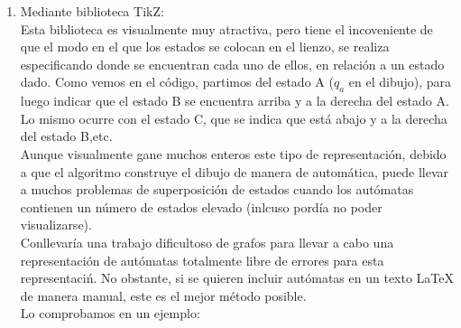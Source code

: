 \documentclass[12pt,a4paper,spanish]{book}
\begin{document}
\begin{itemize}
\begin{enumerate}
\newpage
\item Mediante biblioteca TikZ:\\
\newline
Esta biblioteca es visualmente muy atractiva, pero tiene el incoveniente de que el modo en el que los estados se colocan en el lienzo, se realiza especificando donde se encuentran cada uno de ellos, en relaci\'on a un estado dado.
Como vemos en el c\'odigo, partimos del estado A ($q_{a}$ en el dibujo), para luego indicar que el estado B se encuentra arriba y a la derecha del estado A. Lo mismo ocurre con el estado C, que se indica que est\'a abajo y a la derecha del estado B,etc.\\
\newline
Aunque visualmente gane muchos enteros este tipo de representaci\'on, debido a que el algoritmo construye el dibujo de manera de autom\'atica, puede llevar a muchos problemas de superposici\'on de estados cuando los aut\'omatas contienen un n\'umero de estados elevado (inlcuso pord\'ia no poder visualizarse).\\ 
Conllevar\'ia una trabajo dificultoso de grafos para llevar a cabo una representaci\'on de aut\'omatas totalmente libre de errores para esta representaci\'n.
No obstante, si se quieren incluir aut\'omatas en un texto \LaTeX{} de manera manual, este es el mejor m\'etodo posible.\\
\newline
Lo comprobamos en un ejemplo:
\begin{center}

\end{center}
\end{enumerate}
\end{itemize}
\end{document}

